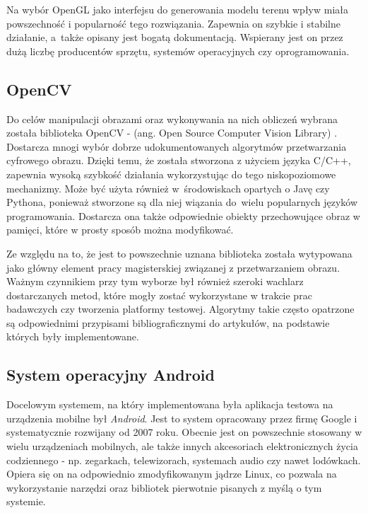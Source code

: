 Na wybór OpenGL jako interfejsu do generowania modelu terenu wpływ miała powszechność i popularność tego rozwiązania. Zapewnia on szybkie i stabilne działanie, a~także opisany jest bogatą dokumentacją. Wspierany jest on przez dużą liczbę producentów sprzętu, systemów operacyjnych czy oprogramowania. 


\subsection{OpenCV}

Do celów manipulacji obrazami oraz wykonywania na nich obliczeń wybrana została biblioteka OpenCV - (ang. Open Source Computer Vision Library) \cite{opencv_home}. Dostarcza mnogi wybór dobrze udokumentowanych algorytmów przetwarzania cyfrowego obrazu. Dzięki temu, że została stworzona z użyciem języka C/C++, zapewnia wysoką szybkość działania wykorzystując do tego niskopoziomowe mechanizmy. Może być użyta również w~środowiskach opartych o Javę czy Pythona, ponieważ stworzone są dla niej wiązania do~wielu popularnych języków programowania. Dostarcza ona także odpowiednie obiekty przechowujące obraz w pamięci, które w prosty sposób można modyfikować.

Ze względu na to, że jest to powszechnie uznana biblioteka została wytypowana jako główny element pracy magisterskiej związanej z przetwarzaniem obrazu. Ważnym czynnikiem przy tym wyborze był również szeroki wachlarz dostarczanych metod, które mogły zostać wykorzystane w trakcie prac badawczych czy tworzenia platformy testowej. Algorytmy takie często opatrzone są odpowiednimi przypisami bibliograficznymi do artykułów, na podstawie których były implementowane.

\subsection{System operacyjny Android}

Docelowym systemem, na który implementowana była aplikacja testowa na urządzenia mobilne był \textit{Android}. Jest to system opracowany przez firmę Google i systematycznie rozwijany od 2007 roku. Obecnie jest on powszechnie stosowany w wielu urządzeniach mobilnych, ale także innych akcesoriach elektronicznych życia codziennego - np. zegarkach, telewizorach, systemach audio czy nawet lodówkach. Opiera się on na odpowiednio zmodyfikowanym jądrze Linux, co pozwala na wykorzystanie narzędzi oraz bibliotek pierwotnie pisanych z myślą o tym systemie. 

